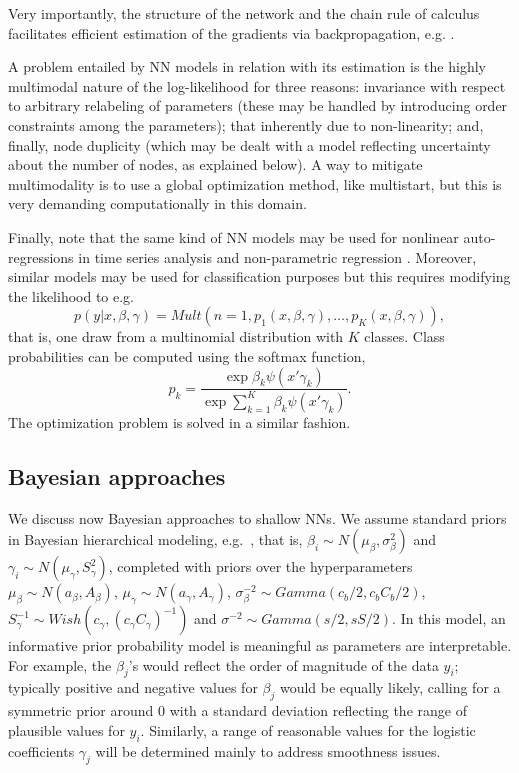 \noindent    Very importantly,  the structure of the network and the 
    chain rule of calculus %
    facilitates efficient estimation of the gradients 
    via backpropagation, e.g. \cite{rumelhart1986learning}.
    
    A problem entailed by NN models in relation 
    with its estimation is the highly multimodal nature of
    the log-likelihood for three reasons:
    invariance with respect to arbitrary relabeling of
    parameters (these may
    be handled by introducing order 
    constraints among the 
    parameters);
    that inherently due to non-linearity; and, finally, 
    node duplicity (which may be dealt 
    with a model reflecting uncertainty 
    about the number of nodes,
    as explained below).
A way to mitigate multimodality is to use a global optimization method, like multistart, but
this is very demanding computationally in this domain.

Finally, note that the same kind of NN models 
may be used for nonlinear auto-regressions in
time series analysis \citep{menchero} and 
non-parametric 
regression \citep{insuamuller}. Moreover,
similar models may be used for classification purposes but this 
 requires modifying the likelihood
\citep{bishop} to e.g.\
\begin{equation}
    p(y | x, \beta, \gamma) = Mult(n=1, 
    p_1 (x, \beta, \gamma) , \ldots, p_K (x, \beta, \gamma) ),
\end{equation}
that is, one draw from a multinomial distribution with $K$ classes. 
Class probabilities
 can be computed using the softmax function,
$$
p_k = \frac{\exp{\beta_k \psi(x'\gamma_k)}}{\exp{\sum_{k=1}^K \beta_k \psi(x'\gamma_k)}}.
$$
The optimization problem is solved in a similar fashion.

\subsection{Bayesian approaches}\label{bayeshallow}
We discuss now Bayesian approaches to shallow NNs.
We assume standard priors 
in Bayesian hierarchical modeling, e.g.\ \citep{LavineWest}, that is,
$  \beta_i      \sim  N(\mu_\beta,\sigma_\beta^2)$
and 
  $\gamma_i     \sim  N(\mu_\gamma,S_\gamma^2)$,
  completed with priors over the hyperparameters
$\mu_\beta \sim N(a_\beta,A_\beta)$,
$\mu_\gamma \sim N(a_\gamma,A_\gamma)$,
$\sigma^{-2}_\beta \sim Gamma(c_b/2,c_bC_b/2)$,
$S_\gamma^{-1} \sim Wish(c_\gamma,(c_\gamma C_\gamma)^{-1})$ and
$\sigma^{-2} \sim Gamma(s/2, sS/2)$.
In this model, 
an informative prior probability model
is meaningful as parameters are interpretable. For example, the $\beta_ j$’s would reflect the
order of magnitude of the data $y_i$; typically positive and negative values for
$\beta _j$ would be equally likely, calling for a symmetric prior around 
0 with
a standard deviation reflecting the range of plausible values for $y_i$. Similarly,
a range of reasonable values for the logistic coefficients $\gamma_ j$ will be determined
mainly to address smoothness
issues.

